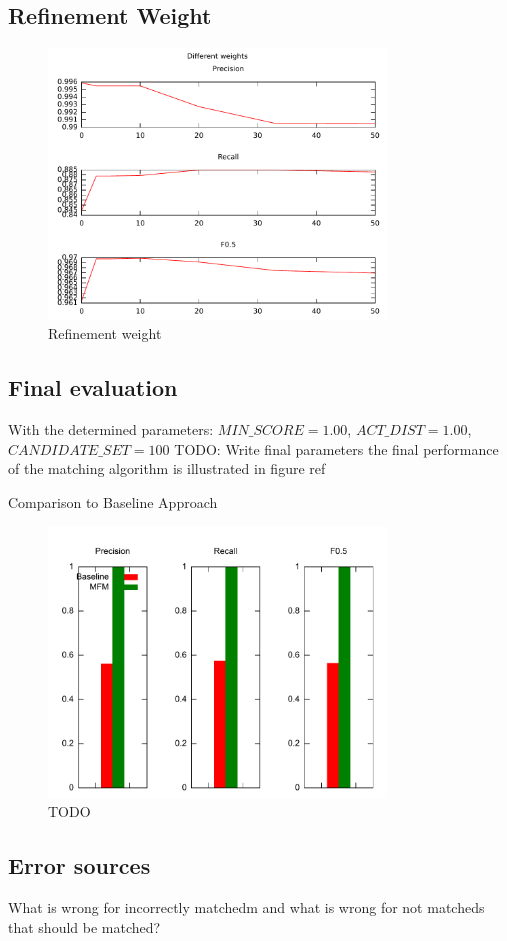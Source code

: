 \subsection{Refinement Weight}

\begin{figure}[h!]
  \begin{center}
  \includegraphics[width=0.8\textwidth]{images/graph_weight.pdf}
  \end{center}
  \caption{Refinement weight}
  \label{fig_weight}
\end{figure}

\subsection{Final evaluation}
With the determined parameters: $MIN\_SCORE = 1.00$, $ACT\_DIST = 1.00$, $CANDIDATE\_SET = 100$
TODO: Write final parameters
the final performance of the matching algorithm is illustrated in figure ref

Comparison to Baseline Approach

\begin{figure}[h!]
  \begin{center}
  \includegraphics[width=0.8\textwidth]{images/baseline.pdf}
  \end{center}
  \caption{TODO}
  \label{fig_baseline}
\end{figure}

\subsection{Error sources}
What is wrong for incorrectly matchedm
and what is wrong for not matcheds that should be matched?